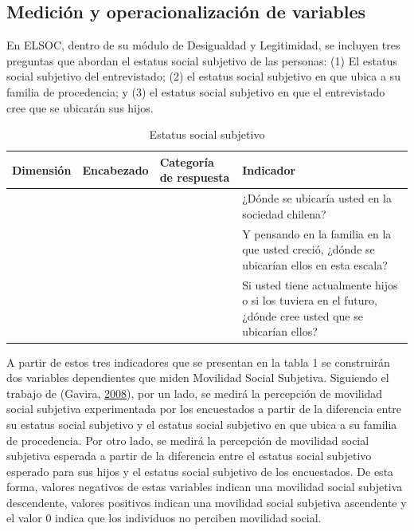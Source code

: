 \documentclass[
]{article}
\begin{document}
\hypertarget{mediciuxf3n-y-operacionalizaciuxf3n-de-variables}{%
\subsection{Medición y operacionalización de
variables}\label{mediciuxf3n-y-operacionalizaciuxf3n-de-variables}}

En ELSOC, dentro de su módulo de Desigualdad y Legitimidad, se incluyen
tres preguntas que abordan el estatus social subjetivo de las personas:
(1) El estatus social subjetivo del entrevistado; (2) el estatus social
subjetivo en que ubica a su familia de procedencia; y (3) el estatus
social subjetivo en que el entrevistado cree que se ubicarán sus hijos.

\begin{table}[!h]

\caption{\label{tab:unnamed-chunk-3}Estatus social subjetivo}
\centering
\fontsize{8}{10}\selectfont
\begin{tabu} to 
\toprule
Dimensión & Encabezado & Categoría de respuesta & Indicador\\
\midrule
 &  &  & ¿Dónde se ubicaría usted en la sociedad chilena?\\
 &  &  & Y pensando en la familia en la que usted creció, ¿dónde se ubicarían ellos en esta escala?\\
 &  &  & Si usted tiene actualmente hijos o si los tuviera en el futuro, ¿dónde cree usted que se ubicarían ellos?\\
\bottomrule
\end{tabu}
\end{table}

A partir de estos tres indicadores que se presentan en la tabla 1 se
construirán dos variables dependientes que miden Movilidad Social
Subjetiva. Siguiendo el trabajo de (Gavira,
\protect\hyperlink{ref-gavira_Social_2008}{2008}), por un lado, se
medirá la percepción de movilidad social subjetiva experimentada por los
encuestados a partir de la diferencia entre su estatus social subjetivo
y el estatus social subjetivo en que ubica a su familia de procedencia.
Por otro lado, se medirá la percepción de movilidad social subjetiva
esperada a partir de la diferencia entre el estatus social subjetivo
esperado para sus hijos y el estatus social subjetivo de los
encuestados. De esta forma, valores negativos de estas variables indican
una movilidad social subjetiva descendente, valores positivos indican
una movilidad social subjetiva ascendente y el valor 0 indica que los
individuos no perciben movilidad social.
\end{document}
